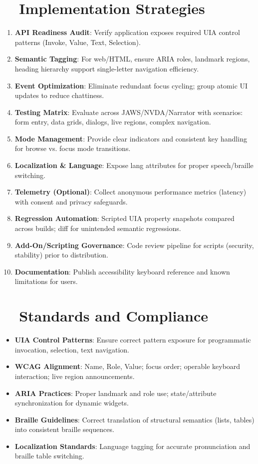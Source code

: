 \section{~~Implementation Strategies}
\label{sec:sr-implementation}
\begin{enumerate}
	\item \textbf{API Readiness Audit}: Verify application exposes required UIA control patterns (Invoke, Value, Text, Selection).
	\item \textbf{Semantic Tagging}: For web/HTML, ensure ARIA roles, landmark regions, heading hierarchy support single-letter navigation efficiency.
	\item \textbf{Event Optimization}: Eliminate redundant focus cycling; group atomic UI updates to reduce chattiness.
	\item \textbf{Testing Matrix}: Evaluate across JAWS/NVDA/Narrator with scenarios: form entry, data grids, dialogs, live regions, complex navigation.
	\item \textbf{Mode Management}: Provide clear indicators and consistent key handling for browse vs. focus mode transitions.
	\item \textbf{Localization \& Language}: Expose lang attributes for proper speech/braille switching.
	\item \textbf{Telemetry (Optional)}: Collect anonymous performance metrics (latency) with consent and privacy safeguards.
	\item \textbf{Regression Automation}: Scripted UIA property snapshots compared across builds; diff for unintended semantic regressions.
	\item \textbf{Add-On/Scripting Governance}: Code review pipeline for scripts (security, stability) prior to distribution.
	\item \textbf{Documentation}: Publish accessibility keyboard reference and known limitations for users.
\end{enumerate}

\section{~~Standards and Compliance}
\label{sec:sr-standards}
\begin{itemize}
	\item \textbf{UIA Control Patterns}: Ensure correct pattern exposure for programmatic invocation, selection, text navigation.
	\item \textbf{WCAG Alignment}: Name, Role, Value; focus order; operable keyboard interaction; live region announcements.
	\item \textbf{ARIA Practices}: Proper landmark and role use; state/attribute synchronization for dynamic widgets.
	\item \textbf{Braille Guidelines}: Correct translation of structural semantics (lists, tables) into consistent braille sequences.
	\item \textbf{Localization Standards}: Language tagging for accurate pronunciation and braille table switching.
\end{itemize}

